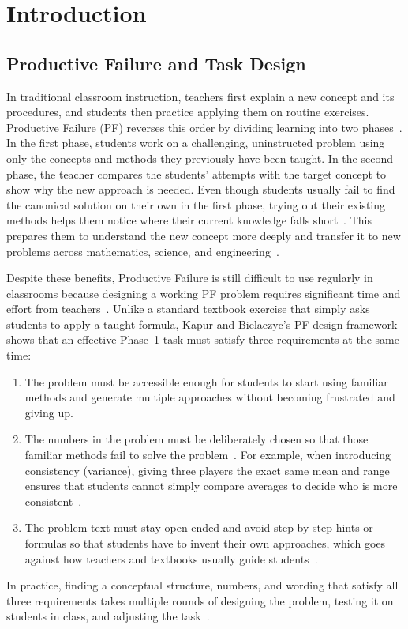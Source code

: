 \chapter{Introduction}
\label{chap:introduction}

\section{Productive Failure and Task Design}
\label{sec:intro-motivation}

In traditional classroom instruction, teachers first explain a new concept and its procedures, and students then practice applying them on routine exercises. Productive Failure (PF) reverses this order by dividing learning into two phases~\cite{kapur2008,kapur2012}. In the first phase, students work on a challenging, uninstructed problem using only the concepts and methods they previously have been taught. In the second phase, the teacher compares the students' attempts with the target concept to show why the new approach is needed. Even though students usually fail to find the canonical solution on their own in the first phase, trying out their existing methods helps them notice where their current knowledge falls short~\cite{loibl2014}. This prepares them to understand the new concept more deeply and transfer it to new problems across mathematics, science, and engineering~\cite{kapur2008,kapur2012,sinha2021}.

Despite these benefits, Productive Failure is still difficult to use regularly in classrooms because designing a working PF problem requires significant time and effort from teachers~\cite{kapur2012}. Unlike a standard textbook exercise that simply asks students to apply a taught formula, Kapur and Bielaczyc's PF design framework~\cite{kapur2009,kapur2012} shows that an effective Phase~1 task must satisfy three requirements at the same time:
\begin{enumerate}[leftmargin=0.7cm,itemsep=0.25em,topsep=0.3em]
    \item The problem must be accessible enough for students to start using familiar methods and generate multiple approaches without becoming frustrated and giving up.
    \item The numbers in the problem must be deliberately chosen so that those familiar methods fail to solve the problem~\cite{kapur2012}. For example, when introducing consistency (variance), giving three players the exact same mean and range ensures that students cannot simply compare averages to decide who is more consistent~\cite{loibl2014}.
    \item The problem text must stay open-ended and avoid step-by-step hints or formulas so that students have to invent their own approaches, which goes against how teachers and textbooks usually guide students~\cite{kapur2012}.
\end{enumerate}
In practice, finding a conceptual structure, numbers, and wording that satisfy all three requirements takes multiple rounds of designing the problem, testing it on students in class, and adjusting the task~\cite{kapur2012}.


